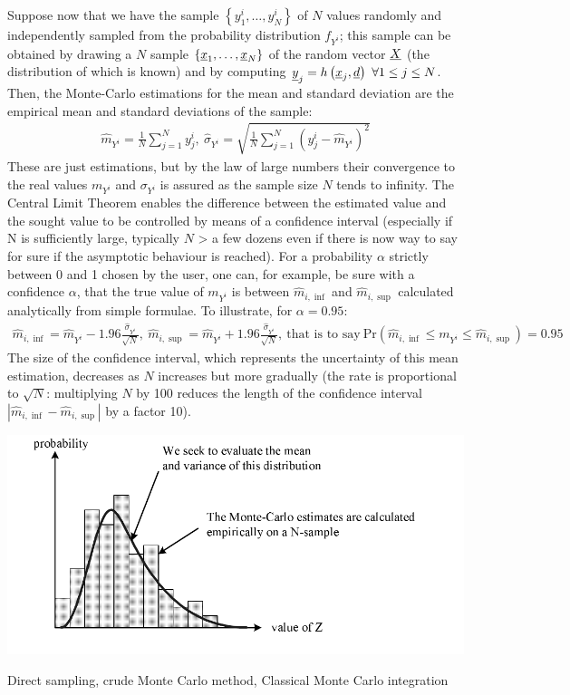 {  Suppose now that we have the sample $\left\{ y^i_1,\ldots,y^i_N \right\}$ of $N$ values randomly and independently sampled from the probability distribution $f_{Y^i}$; this sample can be obtained by drawing a $N$ sample $\left\{ {\underline{x}}_1,\ldots,{\underline{x}}_N \right\}$ of the random vector ${\underline{X}}$ (the distribution of which is known) and by computing ${\underline{y}}_j = h \left( {\underline{x}}_j,\underline{d} \right) \ \forall 1 \leq j \leq N$.
  Then, the Monte-Carlo estimations for the mean and standard deviation are the empirical mean and standard deviations of the sample:
  \begin{align*}
    \widehat{m}_{Y^i} = \frac{1}{N} \sum_{j=1}^N y^i_j,\ \widehat{\sigma}_{Y^i} = \sqrt{\frac{1}{N} \sum_{j=1}^N \left( y^i_j - \widehat{m}_{Y^i} \right)^2}
  \end{align*}
  These are just estimations, but by the law of large numbers their convergence to the real values $m_{Y^i}$ and $\sigma_{Y^i}$ is assured as the sample size $N$ tends to infinity. The Central Limit Theorem enables the difference between the estimated value and the sought value to be controlled by means of a confidence interval (especially if N is sufficiently large, typically $N$ > a few dozens even if there is now way to say for sure if the asymptotic behaviour is reached). For a probability $\alpha$ strictly between 0 and 1 chosen by the user, one can, for example, be sure with a confidence $\alpha$, that the true value of $m_{Y^i}$ is between $\widehat{m}_{i,\inf}$ and $\widehat{m}_{i,\sup}$ calculated analytically from simple formulae. To illustrate, for $\alpha = 0.95$:
  \begin{align*}
    \widehat{m}_{i,\inf} = \widehat{m}_{Y^i} - 1.96 \frac{\displaystyle \widehat{\sigma}_{Y^i}}{\displaystyle \sqrt{N}},\ \widehat{m}_{i,\sup} = \widehat{m}_{Y^i} + 1.96 \frac{\widehat{\sigma}_{Y^i}}{\sqrt{N}},\ \textrm{that is to say}\ \textrm{Pr} \left(  \widehat{m}_{i,\inf} \leq m_{Y^i} \leq \widehat{m}_{i,\sup} \right) = 0.95
  \end{align*}
  The size of the confidence interval, which  represents the uncertainty of this mean estimation, decreases as $N$ increases but more gradually (the rate is proportional to $\sqrt{N}$: multiplying $N$ by 100 reduces the length of the confidence interval  $\left| \widehat{m}_{i,\inf}-\widehat{m}_{i,\sup} \right|$ by a factor 10).

  \begin{center}
    \includegraphics[scale=0.8]{Figures/MC.pdf}
  \end{center}
}
{
  Direct sampling, crude Monte Carlo method, Classical Monte Carlo integration
}


